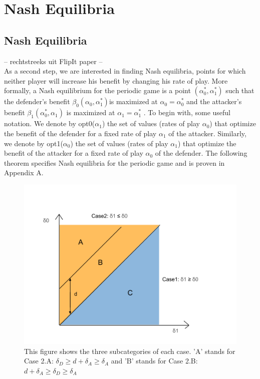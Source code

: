 \chapter{Nash Equilibria}
\label{chapter:Nash}
%


\section{Nash Equilibria}
-- rechtstreeks uit FlipIt paper --\\
As a second step, we are interested in finding Nash equilibria, points
for which neither player will increase his benefit by changing his rate of play. More
formally, a Nash equilibrium for the periodic game is a point $(\alpha_{0}^{*},\alpha_{1}^{*})$ such that
the defender's benefit $\beta_{0}(\alpha_{0},\alpha_{1}^{*}) $is maximized at $\alpha_{0}= \alpha_{0}^{*}$ and the attacker's benefit
$\beta_{1}(\alpha_{0}^{*},\alpha_{1}) $ is maximized at $\alpha_{1}= \alpha_{1}^{*}$ .
To begin with, some useful notation. We denote by opt0($\alpha_{1}$) the set of values (rates
of play $\alpha_{0}$) that optimize the benefit of the defender for a fixed rate of play $\alpha_{1}$ of the
attacker. Similarly, we denote by opt1($\alpha_{0}$) the set of values (rates of play $\alpha_{1}$) that optimize
the benefit of the attacker for a fixed rate of play $\alpha_{0}$ of the defender. The following
theorem specifies Nash equilibria for the periodic game and is proven in Appendix A. \\
\begin{figure}[hbtp]
\centering
\includegraphics[scale=0.4]{Images/bestresp.png}
\caption{This figure shows the three subcategories of each case. 'A' stands for Case 2.A: $\delta_{D} \geq d+\delta_{A} \geq \delta_{A}$ and 'B' stands for Case 2.B: $d+\delta_{A} \geq \delta_{D} \geq  \delta_{A} $ }
\label{grafiekbestr}
\end{figure}


